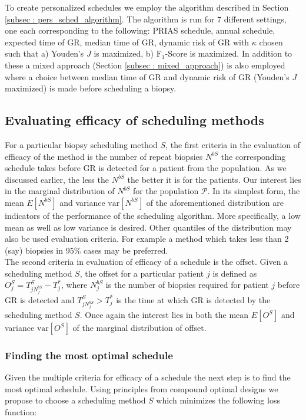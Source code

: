 To create personalized schedules we employ the algorithm described in Section \ref{subsec : pers_sched_algorithm}. The algorithm is run for 7 different settings, one each corresponding to the following: PRIAS schedule, annual schedule, expected time of GR, median time of GR, dynamic risk of GR with $\kappa$ chosen such that a) Youden's $J$ is maximized, b) $\text{F}_1$-Score is maximized. In addition to these a mixed approach (Section \ref{subsec : mixed_approach}) is also employed where a choice between median time of GR and dynamic risk of GR (Youden's $J$ maximized) is made before scheduling a biopsy.

\subsection{Evaluating efficacy of scheduling methods}
For a particular biopsy scheduling method $S$, the first criteria in the evaluation of efficacy of the method is the number of repeat biopsies $N^{bS}$ the corresponding schedule takes before GR is detected for a patient from the population. As we discussed earlier, the less the $N^{bS}$ the better it is for the patients. Our interest lies in the marginal distribution of $N^{bS}$ for the population $\mathcal{P}$. In its simplest form, the mean $E[N^{bS}]$ and variance $\mbox{var}[N^{bS}]$ of the aforementioned distribution are indicators of the performance of the scheduling algorithm. More specifically, a low mean as well as low variance is desired. Other quantiles of the distribution may also be used evaluation criteria. For example a method which takes less than 2 (say) biopsies in 95\% cases may be preferred.\\

The second criteria in evaluation of efficacy of a schedule is the offset. Given a scheduling method $S$, the offset for a particular patient $j$ is defined as $O^S_j = T^S_{j{N^{bS}_j}} - T^*_j$, where $N^{bS}_j$ is the number of biopsies required for patient $j$ before GR is detected and $T^S_{j{N^{bS}_j}} > T^*_j$ is the time at which GR is detected by the scheduling method $S$. Once again the interest lies in both the mean $E[O^S]$ and variance $\mbox{var}[O^S]$ of the marginal distribution of offset.

\subsubsection{Finding the most optimal schedule}
Given the multiple criteria for efficacy of a schedule the next step is to find the most optimal schedule. Using principles from compound optimal designs \citep{lauter1976optimal} we propose to choose a scheduling method $S$ which minimizes the following loss function:

